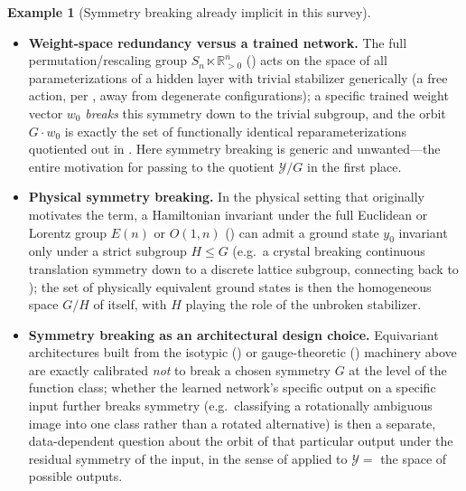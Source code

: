 \documentclass[11pt]{article}
\theoremstyle{plain}
\theoremstyle{definition}
\newtheorem{Example}{Example}[section]
\begin{document}
\begin{Example}[Symmetry breaking already implicit in this survey]\label{ex:symmetry-breaking}
\phantom{u}
\begin{itemize}
    \item \textbf{Weight-space redundancy versus a trained network.} The
    full permutation/rescaling group $S_n \ltimes \mathbb{R}_{>0}^n$
    () acts on the space of all
    parameterizations of a hidden layer with trivial stabilizer generically
    (a free action, per , away from
    degenerate configurations); a specific trained weight vector $w_0$
    \emph{breaks} this symmetry down to the trivial subgroup, and the orbit
    $G \cdot w_0$ is exactly the set of functionally identical
    reparameterizations quotiented out in
    . Here symmetry breaking is
    generic and unwanted---the entire motivation for passing to the
    quotient $\mathcal{Y}/G$ in the first place.
    \item \textbf{Physical symmetry breaking.} In the physical setting that
    originally motivates the term, a Hamiltonian invariant under the full
    Euclidean or Lorentz group $E(n)$ or $O(1,n)$
    () can admit a ground state $y_0$ invariant
    only under a strict subgroup $H \leq G$ (e.g.\ a crystal breaking
    continuous translation symmetry down to a discrete lattice subgroup,
    connecting back to ); the set of
    physically equivalent ground states is then the homogeneous space
    $G/H$ of  itself, with $H$ playing the
    role of the unbroken stabilizer.
    \item \textbf{Symmetry breaking as an architectural design choice.}
    Equivariant architectures built from the isotypic
    () or gauge-theoretic
    () machinery above are exactly
    calibrated \emph{not} to break a chosen symmetry $G$ at the level of the
    function class; whether the learned network's specific output on a
    specific input further breaks symmetry (e.g.\ classifying a
    rotationally ambiguous image into one class rather than a rotated
    alternative) is then a separate, data-dependent question about the
    orbit of that particular output under the residual symmetry of the
    input, in the sense of  applied
    to $\mathcal{Y} = $ the space of possible outputs.
\end{itemize}
\end{Example}
\end{document}
